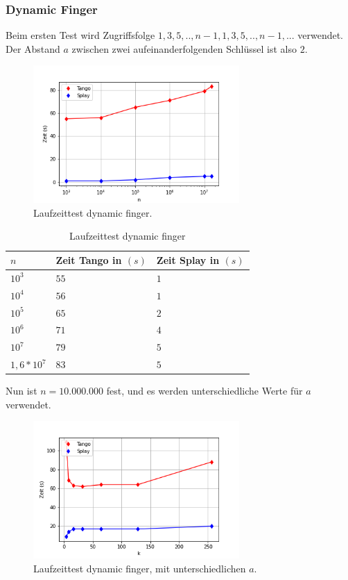 \documentclass[a4paper,12pt]{article}
\begin{document}
\subsubsection{Dynamic Finger}
Beim ersten Test wird Zugriffsfolge $1, 3, 5,..,n-1, 1, 3, 5, .., n-1,...$ verwendet. Der Abstand $a$ zwischen zwei aufeinanderfolgenden Schlüssel ist also $2$.
\begin{figure}[H]
	\centering
	\includegraphics[width=0.7\textwidth]{"Medien/laufzeittest/diagramm/dynamicfinger"}
	\caption{Laufzeittest dynamic finger.}
\end{figure}
\begin{table}[H]
	\begin{center}
		\begin{tabular}[c]{|l|l|l|}
			\hline
			$n$ & Zeit Tango in $\left(s\right)$ &Zeit Splay in $\left(s\right)$ \\
			\hline
			$10^3$ & $55$ &$1$ \\
			\hline
			$10^4$  & $56$ &$1$  \\
			\hline
			$10^5$  & $65$ &$2$  \\
			\hline
			$10^6$  & $71$ &$4$  \\
			\hline
			$10^7$  & $79$ &$5$  \\
			\hline
			$1,6 *10^7$  & $83$ &$5$  \\
			\hline
		\end{tabular}
		\caption{Laufzeittest dynamic finger} 
	\end{center}
\end{table}
\noindent Nun ist $n = 10.000.000$ fest, und es werden unterschiedliche Werte für $a$ verwendet.
\begin{figure}[H]
	\centering
	\includegraphics[width=0.7\textwidth]{"Medien/laufzeittest/diagramm/dynamicfingerNfest"}
	\caption{Laufzeittest dynamic finger, mit unterschiedlichen $a$.}
\end{figure}
\end{document}
